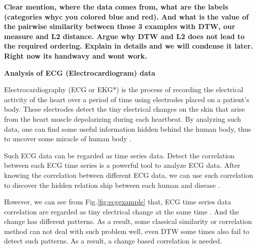{\bf \color{red} Clear mention, where the data comes from, what are the labels (categories whyc you colored blue and red). And what is the value of the pairwise similarity between those 3 examples with DTW, our measure and L2 distance. Argue why DTW and L2 does not lead to the required ordering. Explain in details and we will condense it later. Right now its handwavy and wont work.}





\textbf{Analysis of ECG (Electrocardiogram) data}

Electrocardiography \cite{holter1961new} (ECG or EKG*)
is the process of recording the electrical activity of the heart over a period of time using electrodes placed on a patient's body.
These electrodes detect the tiny electrical changes on the skin that arise from the heart muscle depolarizing during each heartbeat.
By analyzing such data, one can find some useful information hidden behind the human body, thus to uncover some miracle of human body \cite{tilley1979essentials}.

Such ECG data can be regarded as time series data. Detect the correlation between each ECG time series is a powerful tool to analyze ECG data. After knowing the correlation between different ECG data, we can use such correlation to discover the hidden relation ship between each human and disease \cite{marriott1988practical}.

However, we can see from Fig.\ref{fig:ecgexample} that, ECG time series data correlation are regarded as tiny electrical change at the same time \cite{tilley1979essentials}. And the change has different patterns. As a result, some classical similarity or correlation method can not deal with such problem well, even DTW some times also fail to detect such patterns. As a result, a change based correlation is needed.


